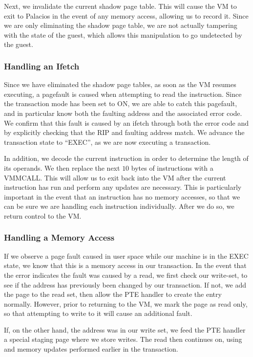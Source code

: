 \documentclass{acm_proc_article-sp}
\begin{document}
Next, we invalidate the current shadow page table. This will cause the VM to 
exit to Palacios in the event of any memory access, allowing us to record it.
Since we are only eliminating the shadow page table, we are not actually
tampering with the state of the guest, which allows this manipulation to go
undetected by the guest.

\subsubsection{Handling an Ifetch}

Since we have eliminated the shadow page tables, as soon as the VM resumes
executing, a pagefault is caused when attempting to read the instruction.
Since the transaction mode has been set to ON, we are able to catch this
pagefault, and in particular know both the faulting address and the associated
error code. We confirm that this fault is caused by an ifetch through both
the error code and by explicitly checking that the RIP and faulting address
match. We advance the transaction state to ``EXEC'', as we are now executing
a transaction. 
  
In addition, we decode the current instruction in order to determine the length
of its operands. We then replace the next $10$ bytes of instructions with
a VMMCALL. This will allow us to exit back into the VM after the current
instruction has run and perform any updates are necessary. This is particularly
important in the event that an instruction has no memory accesses, so that we
can be sure we are handling each instruction individually. After we do so, 
we return control to the VM.

\subsubsection{Handling a Memory Access}

If we observe a page fault caused in user space while our machine is in the
EXEC state, we know that this is a memory access in our transaction. In the 
event that the error indicates the fault was caused by a read, we first check
our write-set, to see if the address has previously been changed by our 
transaction. If not, we add the page to the read set, then allow the PTE
handler to create the entry normally. However, prior to returning to the VM,
we mark the page as read only, so that attempting to write to it will cause
an additional fault.

If, on the other hand, the address was in our write set, we feed the PTE
handler a special staging page where we store writes. The read then continues
on, using and memory updates performed earlier in the transaction.
\end{document}
